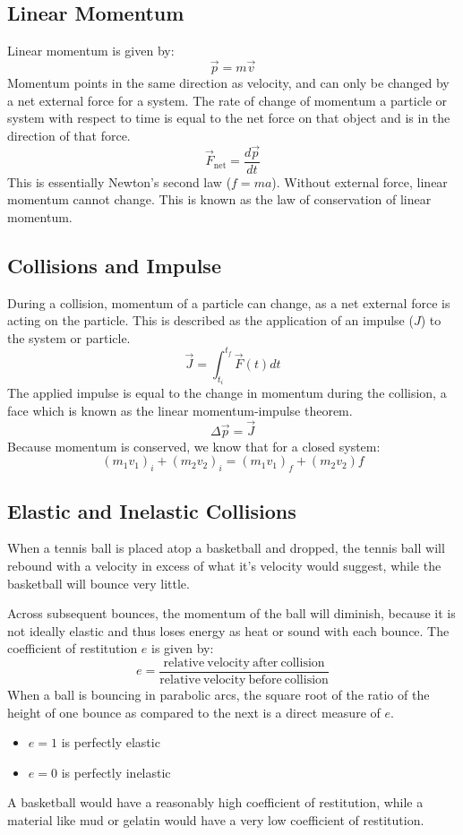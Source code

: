 \documentclass[12pt]{report}
\begin{document}
\begin{flushleft}
\subsection*{Linear Momentum}
Linear momentum is given by:
\[\vec{p} = m\vec{v}\]
Momentum points in the same direction as velocity, and can only be changed by a
net external force for a system. The rate of change of momentum a particle or 
system with respect to time is equal to the net force on that object and is in
the direction of that force. 
\[\vec{F}_\mathrm{net} = \frac{d\vec{p}}{dt}\]
This is essentially Newton's second law (\(f = ma\)). Without external force, 
linear momentum cannot change. This is known as the law of conservation of 
linear momentum.

\subsection*{Collisions and Impulse}
During a collision, momentum of a particle can change, as a net external force
is acting on the particle. This is described as the application of an impulse 
(\(J\)) to the system or particle.
\[\vec{J} = \int^{t_f}_{t_i}\vec{F}(t)dt\]
The applied impulse is equal to the change in momentum during the collision, a
face which is 
known as the linear momentum-impulse theorem.
\[\Delta\vec{p} = \vec{J}\]
Because momentum is conserved, we know that for a closed system:
\[(m_1v_1)_i + (m_2v_2)_i = (m_1v_1)_f + (m_2v_2)f\]

\subsection*{Elastic and Inelastic Collisions}
When a tennis ball is placed atop a basketball and dropped, the tennis
ball will rebound with a velocity in excess of what it's velocity would
suggest, while the basketball will bounce very little.

\bigskip
Across subsequent bounces, the momentum of the ball will diminish, because
it is not ideally elastic and thus loses energy as heat or sound with each 
bounce. The coefficient of restitution \(e\) is given by:
\[e = \frac{\mathrm{relative\:velocity\:after\:collision}}{\mathrm
{relative\:velocity\:before\:collision}}\]
When a ball is bouncing in parabolic arcs, the square root of the ratio of the
height of one bounce as compared to the next is a direct measure of \(e\).
\begin{itemize}
    \item \(e = 1\) is perfectly elastic
    \item \(e = 0\) is perfectly inelastic
\end{itemize}
A basketball would have a reasonably high coefficient of restitution, while
a material like mud or gelatin would have a very low coefficient of
restitution.


\end{flushleft}
\end{document}
